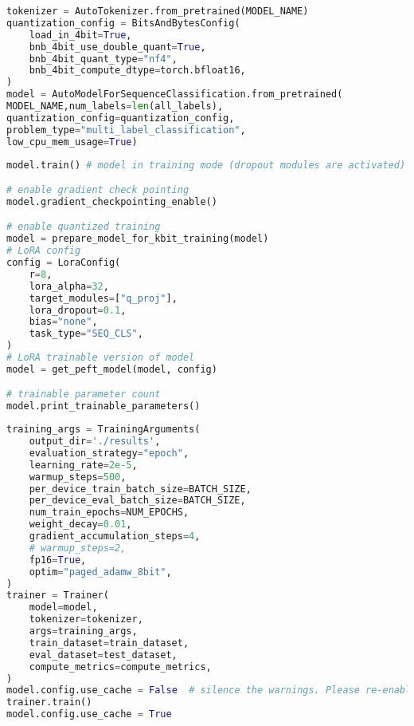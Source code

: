 \begin{latin}
	\begin{lstlisting}[language=Python, title=\rl{بارگذاری توکنایزر و مدل و فشرده کردن مدل}]
tokenizer = AutoTokenizer.from_pretrained(MODEL_NAME)
quantization_config = BitsAndBytesConfig(
    load_in_4bit=True,
    bnb_4bit_use_double_quant=True,
    bnb_4bit_quant_type="nf4",
    bnb_4bit_compute_dtype=torch.bfloat16,
)
model = AutoModelForSequenceClassification.from_pretrained(
MODEL_NAME,num_labels=len(all_labels),
quantization_config=quantization_config,
problem_type="multi_label_classification",
low_cpu_mem_usage=True)
\end{lstlisting}
\end{latin}

\begin{latin}
	\begin{lstlisting}[language=Python, title=\rl{استفاده از حالت مصرف بهینه رم برای پارامتر ها با استفاده از \lr{PEFT}}]
model.train() # model in training mode (dropout modules are activated)

# enable gradient check pointing
model.gradient_checkpointing_enable()

# enable quantized training
model = prepare_model_for_kbit_training(model)
# LoRA config
config = LoraConfig(
    r=8,
    lora_alpha=32,
    target_modules=["q_proj"],
    lora_dropout=0.1,
    bias="none",
    task_type="SEQ_CLS",
)
# LoRA trainable version of model
model = get_peft_model(model, config)

# trainable parameter count
model.print_trainable_parameters()
\end{lstlisting}
\end{latin}

\begin{latin}
	\begin{lstlisting}[language=Python, title=\rl{آموزش دادن مدل}]
training_args = TrainingArguments(
	output_dir='./results',
	evaluation_strategy="epoch",
	learning_rate=2e-5,
	warmup_steps=500,
	per_device_train_batch_size=BATCH_SIZE,
	per_device_eval_batch_size=BATCH_SIZE,
	num_train_epochs=NUM_EPOCHS,
	weight_decay=0.01,
	gradient_accumulation_steps=4,
	# warmup_steps=2,
	fp16=True,
	optim="paged_adamw_8bit",
)
trainer = Trainer(
    model=model,
    tokenizer=tokenizer,
    args=training_args,
    train_dataset=train_dataset,
    eval_dataset=test_dataset,
    compute_metrics=compute_metrics,
)
model.config.use_cache = False  # silence the warnings. Please re-enable for inference!
trainer.train()
model.config.use_cache = True
\end{lstlisting}
\end{latin}
\clearpage